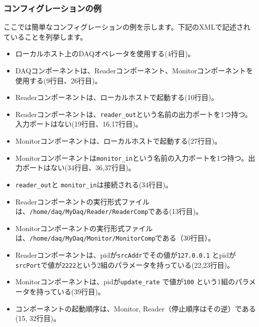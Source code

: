 \documentclass[a4j,10pt,dvips,onecolumn,oneside,final]{jarticle}%
\begin{document}
\subsubsection{コンフィグレーションの例}
ここでは簡単なコンフィグレーションの例を示します。下記のXMLで記述されていることを列挙します。
\begin{itemize}
\item ローカルホスト上のDAQオペレータを使用する(4行目)。
\item DAQコンポーネントは、Readerコンポーネント、Monitorコンポーネントを使用する(9行目、26行目)。
\item Readerコンポーネントは、ローカルホストで起動する(10行目)。
\item Readerコンポーネントは、\verb|reader_out|という名前の出力ポートを1つ持つ。入力ポートはない(19行目、16,17行目)。
\item Monitorコンポーネントは、ローカルホストで起動する(27行目)。
\item Monitorコンポーネントは\verb|monitor_in|という名前の入力ポートを1つ持つ。出力ポートはない(34行目、36,37行目)。
\item \verb|reader_out|と \verb|monitor_in|は接続される(34行目)。
\item Readerコンポーネントの実行形式ファイルは、\verb|/home/daq/MyDaq/Reader/ReaderComp|である(13行目)。
\item Monitorコンポーネントの実行形式ファイルは、\verb|/home/daq/MyDaq/Monitor/MonitorComp|である（30行目）。
\item Readerコンポーネントは、pidが\verb|srcAddr|でその値が\verb|127.0.0.1| とpidが\verb|srcPort|で値が\verb|2222|という2組のパラメータを持っている(22,23行目)。
\item Monitorコンポーネントは、pidが\verb|update_rate| で値が\verb|100| という1組のパラメータを持っている(39行目)。
\item コンポーネントの起動順序は、Monitor, Reader（停止順序はその逆）である(15, 32行目)。
\end{itemize}

\end{document}
